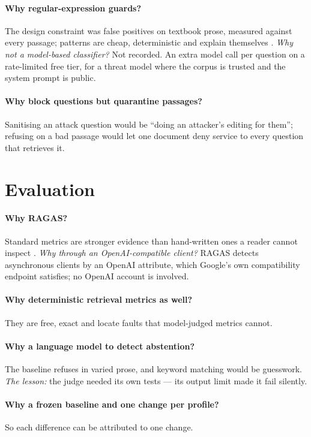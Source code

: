 \paragraph{Why regular-expression guards?} The design constraint was false positives on textbook prose, measured against every passage; patterns are cheap, deterministic and explain themselves . \emph{Why not a model-based classifier?} Not recorded. \tagI An extra model call per question on a rate-limited free tier, for a threat model where the corpus is trusted and the system prompt is public.

\paragraph{Why block questions but quarantine passages?} Sanitising an attack question would be \enquote{doing an attacker's editing for them}; refusing on a bad passage would let one document deny service to every question that retrieves it.

\section{Evaluation}

\paragraph{Why RAGAS?} Standard metrics are stronger evidence than hand-written ones a reader cannot inspect . \emph{Why through an OpenAI-compatible client?} RAGAS detects asynchronous clients by an OpenAI attribute, which Google's own compatibility endpoint satisfies; no OpenAI account is involved.

\paragraph{Why deterministic retrieval metrics as well?} They are free, exact and locate faults that model-judged metrics cannot.

\paragraph{Why a language model to detect abstention?} The baseline refuses in varied prose, and keyword matching would be guesswork. \emph{The lesson:} the judge needed its own tests --- its output limit made it fail silently.

\paragraph{Why a frozen baseline and one change per profile?} So each difference can be attributed to one change.


